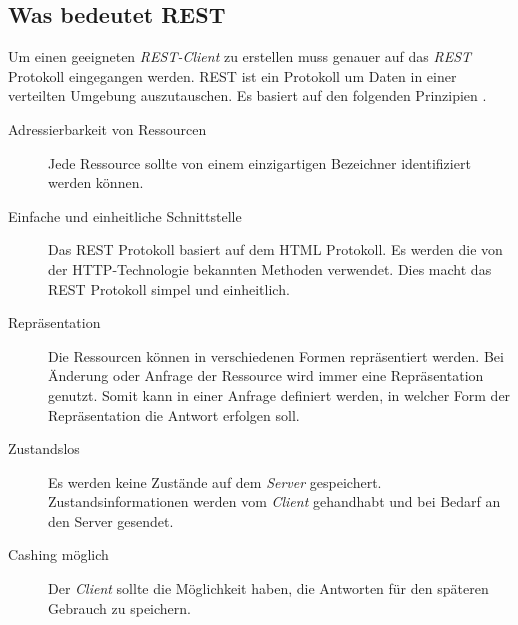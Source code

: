 \documentclass[12pt, paper=a4, bibtotoc, toc=listof, headsepline=true, numbers=endperiod]{scrreprt}
\begin{document}
\subsection{Was bedeutet REST}
Um einen geeigneten \emph{REST-Client} zu erstellen muss genauer auf das \emph{REST} Protokoll eingegangen werden. \ac{REST} ist ein Protokoll um Daten in einer verteilten Umgebung auszutauschen. Es basiert auf den folgenden Prinzipien \cite[S.77]{chauhan2014asp}.
\begin{description}  
	\item  [Adressierbarkeit von Ressourcen]
	Jede Ressource sollte von einem einzigartigen Bezeichner identifiziert werden können.
	
	\item [Einfache und einheitliche Schnittstelle]
	Das \ac{REST} Protokoll basiert auf dem \ac{HTML} Protokoll. Es werden die von der \ac{HTTP}-Technologie bekannten Methoden verwendet. Dies macht das \ac{REST} Protokoll 
	simpel und einheitlich.
	
	\item  [Repräsentation] 
	Die Ressourcen können in verschiedenen Formen repräsentiert werden. Bei Änderung oder Anfrage der Ressource wird immer eine Repräsentation genutzt. Somit kann in einer Anfrage definiert werden, in welcher Form der Repräsentation die Antwort erfolgen soll.
	
	\item [Zustandslos]
	Es werden keine Zustände auf dem \emph{Server} gespeichert. Zustandsinformationen werden vom \emph{Client} gehandhabt und bei Bedarf an den Server gesendet.
	
	\item [Cashing möglich]
	Der \emph{Client} sollte die Möglichkeit haben,  die Antworten für den späteren Gebrauch zu speichern.	
\end{description}
\end{document}
